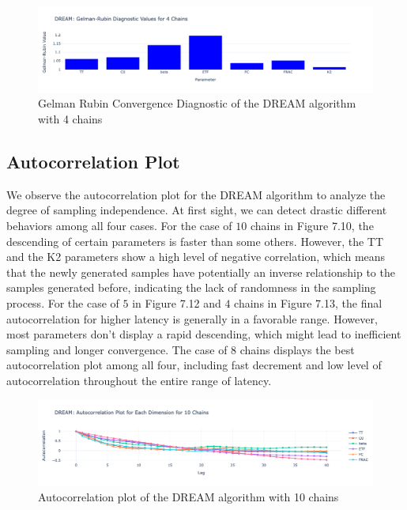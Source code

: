 \begin{figure}[H]
    \centering
    \includegraphics[width=1\textwidth]{figures/dream/gr_4.png}
    \captionsetup{width=.8\textwidth}
    \caption{Gelman Rubin Convergence Diagnostic of the DREAM algorithm with 4 chains}
    \label{fig:enter-label}
\end{figure}

\subsection{Autocorrelation Plot}
We observe the autocorrelation plot for the DREAM algorithm to analyze the degree of sampling independence. At first sight, we can detect drastic different behaviors among all four cases. For the case of $10$ chains in Figure 7.10, the descending of certain parameters is faster than some others. However, the TT and the K2 parameters show a high level of negative correlation, which means that the newly generated samples have potentially an inverse relationship to the samples generated before, indicating the lack of randomness in the sampling process. For the case of $5$ in Figure 7.12 and $4$ chains in Figure 7.13, the final autocorrelation for higher latency is generally in a favorable range. However, most parameters don't display a rapid descending, which might lead to inefficient sampling and longer convergence. The case of $8$ chains displays the best autocorrelation plot among all four, including fast decrement and low level of autocorrelation throughout the entire range of latency.
\begin{figure}[H]
    \centering
    \includegraphics[width=1\textwidth]{figures/dream/ac_10.png}
    \captionsetup{width=.8\textwidth}
    \caption{Autocorrelation plot of the DREAM algorithm with 10 chains}
    \label{fig:enter-label}
\end{figure}

